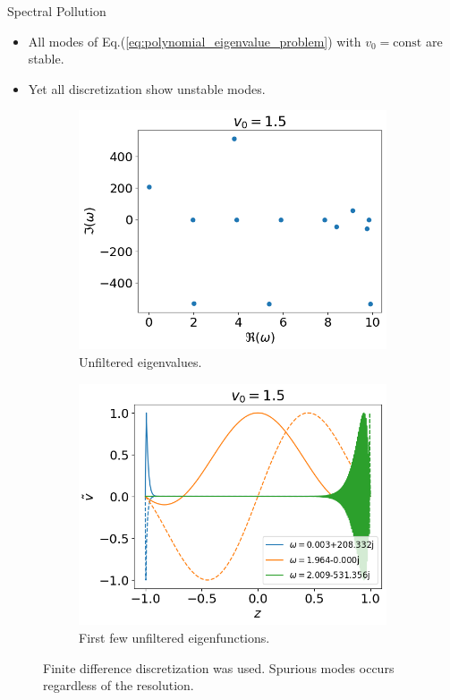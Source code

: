 \begin{frame}{Spectral Pollution}
  \begin{itemize}
    \item All modes of Eq.(\ref{eq:polynomial_eigenvalue_problem}) with $v_0=\text{const}$ are stable.
    \item Yet all discretization show unstable modes.
  \end{itemize}
  \begin{figure}[htbp]	
    \centering
    \begin{subfigure}[b]{0.5\linewidth}
      \includegraphics[width=0.9\linewidth]{figures/eigvals-bad} 
      \caption{Unfiltered eigenvalues.}
    \end{subfigure}%
    \begin{subfigure}[b]{0.5\linewidth}
      \includegraphics[width=0.9\linewidth]{figures/eigvecs-bad} 
      \caption{First few unfiltered eigenfunctions.}
    \end{subfigure}
    \caption{Finite difference discretization was used. Spurious modes occurs regardless of the resolution.}
    \label{fig:results-bad}
  \end{figure}
\end{frame}

